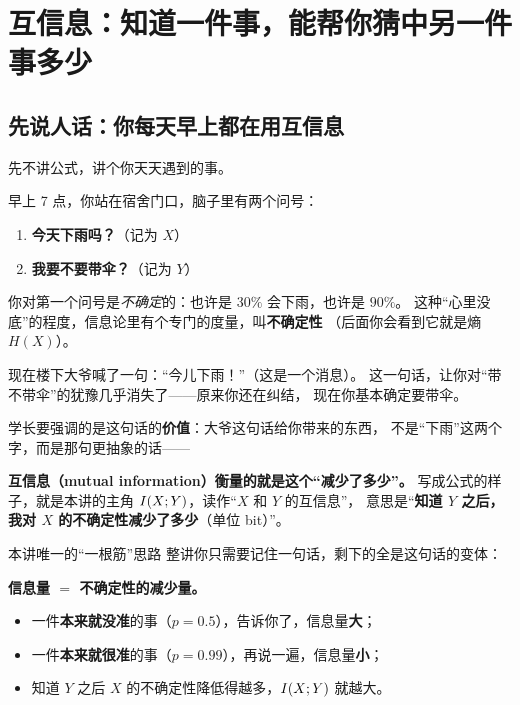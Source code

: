 \section{互信息：知道一件事，能帮你猜中另一件事多少}

\subsection{先说人话：你每天早上都在用互信息}

先不讲公式，讲个你天天遇到的事。

早上 7 点，你站在宿舍门口，脑子里有两个问号：
\begin{enumerate}[leftmargin=1.8em,itemsep=1pt,topsep=2pt]
  \item \textbf{今天下雨吗？}（记为 $X$）
  \item \textbf{我要不要带伞？}（记为 $Y$）
\end{enumerate}
你对第一个问号是\emph{不确定}的：也许是 $30\%$ 会下雨，也许是 $90\%$。
这种“心里没底”的程度，信息论里有个专门的度量，叫\textbf{不确定性}
（后面你会看到它就是熵 $H(X)$）。

现在楼下大爷喊了一句：“今儿下雨！”（这是一个消息）。
这一句话，让你对“带不带伞”的犹豫几乎消失了——原来你还在纠结，
现在你基本确定要带伞。

学长要强调的是这句话的\textbf{价值}：大爷这句话给你带来的东西，
不是“下雨”这两个字，而是那句更抽象的话——
\begin{center}
\end{center}
\textbf{互信息（mutual information）衡量的就是这个“减少了多少”。}
写成公式的样子，就是本讲的主角 $I\!\left(X;Y\right)$，读作“$X$ 和 $Y$ 的互信息”，
意思是“\textbf{知道 $Y$ 之后，我对 $X$ 的不确定性减少了多少}（单位 bit）”。

\begin{idea}{本讲唯一的“一根筋”思路}
整讲你只需要记住一句话，剩下的全是这句话的变体：

\medskip
\textbf{信息量 $=$ 不确定性的减少量。}

\medskip
\begin{itemize}[leftmargin=1.4em,itemsep=1pt,topsep=1pt]
  \item 一件\textbf{本来就没准}的事（$p=0.5$），告诉你了，信息量\textbf{大}；
  \item 一件\textbf{本来就很准}的事（$p=0.99$），再说一遍，信息量\textbf{小}；
  \item 知道 $Y$ 之后 $X$ 的不确定性降低得越多，$I\!\left(X;Y\right)$ 就越大。
\end{itemize}
\end{idea}

